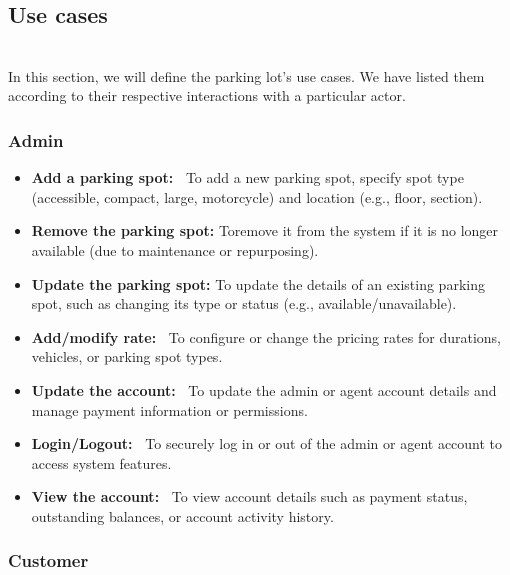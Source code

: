 \subsection{Use cases}\label{XNo71E8pe2rNpqrvtyxwj}
\\
In this section, we will define the parking lot's use cases. We have listed them according to their respective interactions with a particular actor.

\subsubsection{Admin}\label{pW9H7Vm7pAc5oI2TJpwE-}

\begin{itemize}
\item
\protect{}\label{M9hqmbZnUCvHXQLY9tI5B}
\textbf{Add a parking spot:~} To add a new parking spot, specify spot type (accessible, compact, large, motorcycle) and location (e.g., floor, section).
\item
\protect{}\label{M9hqmbZnUCvHXQLY9tI5B}
\textbf{Remove the parking spot:} Toremove it from the system if it is no longer available (due to maintenance or repurposing).
\item
\protect{}\label{r3uqAlxjIDZqZ2s9zJzYA}
\textbf{Update the parking spot:} To update the details of an existing parking spot, such as changing its type or status (e.g., available/unavailable).
\item
\protect{}\label{gnM609Omk1Cp96GOqPAAd}
\textbf{Add/modify rate:~} To configure or change the pricing rates for durations, vehicles, or parking spot types.
\item
\protect{}\label{CP8Jo82tpe58p7HibIzjm}
\textbf{Update the account:~} To update the admin or agent account details and manage payment information or permissions.
\item
\protect{}\label{1W_u_HlSLBYNYTEKx5IHh}
\textbf{Login/Logout:~} To securely log in or out of the admin or agent account to access system features.
\item
\protect{}\label{u-j-HGvludp-wPRpss1Bd}
\textbf{View the account:~} To view account details such as payment status, outstanding balances, or account activity history.
\end{itemize}

\subsubsection{Customer}\label{Qqxi2f8K8lhWf9076MAcb}

